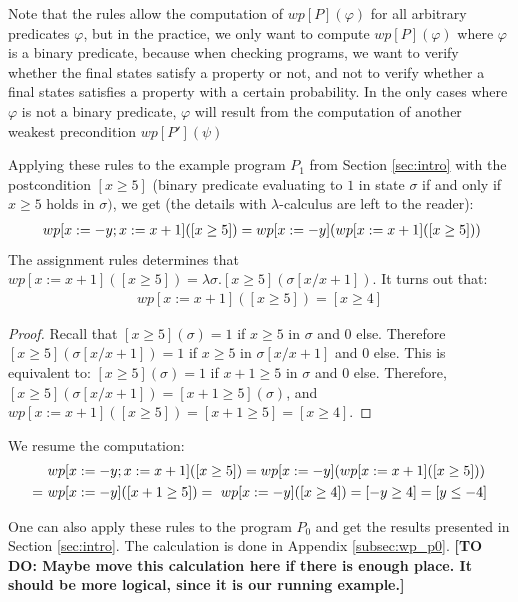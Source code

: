 \documentclass[a4paper,10pt]{llncs}
\newcommand\todo[1]{{\color{red}\textbf{[TO DO:  #1]}}}
\newcommand\notsure[1]{{\color{temp} #1}}
\begin{document}
	\notsure{Note that the rules allow the computation of $wp[P](\varphi)$ for all arbitrary predicates $\varphi$, but in the practice, we only want to compute $wp[P](\varphi)$ where $\varphi$ is a binary predicate, because when checking programs, we want to verify whether the final states satisfy a property or not, and not to verify whether a final states satisfies a property with a certain probability. In the only cases where $\varphi$ is not a binary predicate, $\varphi$ will result from the computation of another weakest precondition $wp[P'](\psi)$} \bigskip
	



Applying these rules to the example program $P_1$ from Section \ref{sec:intro} with the postcondition $[x \geq 5]$ (binary predicate evaluating to $1$ in state $\sigma$ if and only if $x \geq 5$ holds in $\sigma)$, we get (the details with $\lambda$-calculus are left to the reader):
\begin{align*}
 \textnormal{ }wp[x := - y ; x := x+1]([x \geq 5]) = wp[x := - y ](wp[x := x+1]([x \geq 5]))
\end{align*}
The assignment rules determines that $wp[x := x+1]([x \geq 5]) = \lambda\sigma. [x \geq 5](\sigma[x/x+1])$.
It turns out that:
\begin{align*}
wp[x := x+1]([x \geq 5]) = [x \geq 4]
\end{align*}
\begin{proof}
Recall that $[x \geq 5](\sigma) = 1$ if $x \geq 5$ in $\sigma$ and $0$ else. Therefore $[x \geq 5](\sigma[x/x+1]) = 1$ if $x \geq 5$ in $\sigma[x/x+1]$ and $0$ else. This is equivalent to: $[x \geq 5](\sigma) = 1$ if $x+1 \geq 5$ in $\sigma$ and $0$ else. Therefore, $[x \geq 5](\sigma[x/x+1]) = [x+1 \geq 5](\sigma)$, and $wp[x := x+1]([x \geq 5]) = [x+1 \geq 5] = [x \geq 4]$.
\end{proof}
 We resume the computation:
\begin{align*}
& \textnormal{ }wp[x := - y ; x := x+1]([x \geq 5]) = wp[x := - y ](wp[x := x+1]([x \geq 5])) \\
 =& \textnormal{ }wp[x := - y ]([x+1 \geq 5]) = \textnormal{ }wp[x := - y ]([x \geq 4]) = [-y \geq 4] = [y \leq -4] \\
\end{align*}

	One can also apply these rules to the program $P_0$ and get the results presented in Section \ref{sec:intro}. The calculation is done in Appendix \ref{subsec:wp_p0}. \todo{Maybe move this calculation here if there is enough place. It should be more logical, since it is our running example.}
	
\end{document}
